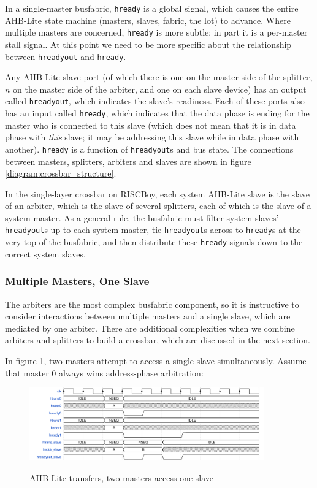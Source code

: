 \documentclass[notitlepage]{article}
\begin{document}
In a single-master busfabric, {\tt hready} is a global signal, which causes the entire AHB-Lite state machine (masters, slaves, fabric, the lot) to advance. Where multiple masters are concerned, {\tt hready} is more subtle; in part it is a per-master stall signal. At this point we need to be more specific about the relationship between {\tt hreadyout} and {\tt hready}.

Any AHB-Lite slave port (of which there is one on the master side of the splitter, $n$ on the master side of the arbiter, and one on each slave device) has an output called {\tt hreadyout}, which indicates the slave's readiness. Each of these ports also has an input called {\tt hready}, which indicates that the data phase is ending for the master who is connected to this slave (which does not mean that it is in data phase with {\it this} slave; it may be addressing this slave while in data phase with another). {\tt hready} is a function of {\tt hreadyout}s and bus state. The connections between masters, splitters, arbiters and slaves are shown in figure \ref{diagram:crossbar_structure}.

In the single-layer crossbar on RISCBoy, each system AHB-Lite slave is the slave of an arbiter, which is the slave of several splitters, each of which is the slave of a system master. As a general rule, the busfabric must filter system slaves' {\tt hreadyout}s up to each system master, tie {\tt hreadyout}s across to {\tt hready}s at the very top of the busfabric, and then distribute these {\tt hready} signals down to the correct system slaves.

\subsubsection{Multiple Masters, One Slave}

The arbiters are the most complex busfabric component, so it is instructive to consider interactions between multiple masters and a single slave, which are mediated by one arbiter. There are additional complexities when we combine arbiters and splitters to build a crossbar, which are discussed in the next section.

In figure \ref{diagram:ahbl_mm_simult1}, two masters attempt to access a single slave simultaneously. Assume that master 0 always wins address-phase arbitration:

\begin{figure}[H]
\centering
\caption{AHB-Lite transfers, two masters access one slave}
\includegraphics[width=0.9\textwidth]{waves/ahbl_mm_simult1.pdf}
\label{diagram:ahbl_mm_simult1}
\end{figure}
\end{document}

